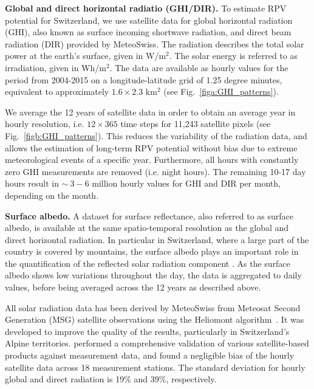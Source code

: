 \textbf{Global and direct horizontal radiatio (GHI/DIR).} To estimate RPV potential for Switzerland, we use satellite data for global horizontal radiation (GHI), also known as surface incoming shortwave radiation, and direct beam radiation (DIR) provided by MeteoSwiss\cite{stockli_daily_2013}. The radiation describes the total solar power at the earth's surface, given in W/m$^2$. The solar energy is referred to as irradiation, given in Wh/m$^2$. The data are available as hourly values for the period from 2004-2015 on a longitude-latitude grid of 1.25 degree minutes, equivalent to approximately $1.6 \times 2.3$ km$^2$ (see Fig.~\ref{figa:GHI_patterns}).  

We average the 12 years of satellite data in order to obtain an average year in hourly resolution, i.e. $12 \times 365$ time steps for 11,243 satellite pixels (see Fig.~\ref{figb:GHI_patterns}). This reduces the variability of the radiation data, and allows the estimation of long-term RPV potential without bias due to extreme meteorological events of a specific year. Furthermore, all hours with constantly zero GHI measurements are removed (i.e. night hours). The remaining 10-17 day hours result in $\sim~3-6$ million hourly values for GHI and DIR per month, depending on the month. 

\textbf{Surface albedo.} A dataset for surface reflectance, also referred to as surface albedo, is available at the same spatio-temporal resolution as the global and direct horizontal radiation. In particular in Switzerland, where a large part of the country is covered by mountains, the surface albedo plays an important role in the quantification of the reflected solar radiation component \cite{kahl_bright_2019}. As the surface albedo shows low variations throughout the day, the data is aggregated to daily values, before being averaged across the 12 years as described above. 

All solar radiation data has been derived by MeteoSwiss from Meteosat Second Generation (MSG) satellite observations using the Heliomont algorithm~\cite{stockli_heliomont_2017}. It was developed to improve the quality of the results, particularly in Switzerland's Alpine territories. 
\citet{ineichen_long_2014} performed a comprehensive validation of various satellite-based products against measurement data, and found a negligible bias of the hourly satellite data across 18 measurement stations. 
The standard deviation for hourly global and direct radiation is 19\% and 39\%, respectively.

